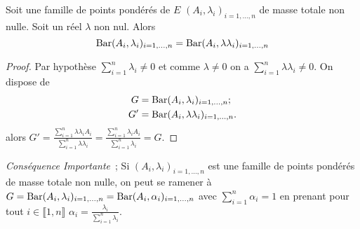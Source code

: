 \begin{prop}[Homogénéité]
  Soit une famille de points pondérés de \(E\) \((A_i,\lambda_i)_{i=1, \ldots, 
  n}\) de masse totale non nulle. Soit un réel \(\lambda\) non nul.  Alors
  \begin{equation}
    \operatorname{Bar}(A_i,\lambda_i)_{i=1, \ldots, n} = \operatorname{Bar}(A_i,\lambda \lambda_i)_{i=1, 
    \ldots, n}
  \end{equation}
\end{prop}

\begin{proof}
  Par hypothèse \(\sum_{i=1}^n \lambda_i \neq 0\) et comme \(\lambda \neq 0\) on 
  a \(\sum_{i=1}^n \lambda \lambda_i \neq 0\). On dispose de
  \begin{align}
    G &= \operatorname{Bar}(A_i,\lambda_i)_{i=1, \ldots, n};\\
    G' &= \operatorname{Bar}(A_i,\lambda\lambda_i)_{i=1, \ldots, n}.
  \end{align}
  alors \(G'= \frac{\sum_{i=1}^n \lambda\lambda_i A_i}{\sum_{i=1}^n 
  \lambda\lambda_i}=\frac{\sum_{i=1}^n \lambda_i A_i}{\sum_{i=1}^n 
  \lambda_i}=G\).
\end{proof}

\emph{Conséquence Importante}~; Si \((A_i,\lambda_i)_{i=1, \ldots, n}\) est une 
famille de points pondérés de masse totale non nulle, on peut se ramener à \(G = 
\operatorname{Bar}(A_i,\lambda_i)_{i=1, \ldots, n}=\operatorname{Bar}(A_i,\alpha_i)_{i=1, \ldots, n}\) 
avec \(\sum_{i=1}^n \alpha_i = 1\) en prenant pour tout \(i \in \llbracket 1,n 
\rrbracket\) \(\alpha_i=\frac{\lambda_i}{\sum_{i=1}^n \lambda_i}\).

